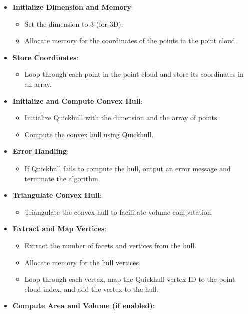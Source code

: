 \begin{itemize}
	\item \textbf{Initialize Dimension and Memory}:
	      \begin{itemize}
		      \item Set the dimension to 3 (for 3D).
		      \item Allocate memory for the coordinates of the points in the point cloud.
	      \end{itemize}
	\item \textbf{Store Coordinates}:
	      \begin{itemize}
		      \item Loop through each point in the point cloud and store its coordinates in an array.
	      \end{itemize}
	\item \textbf{Initialize and Compute Convex Hull}:
	      \begin{itemize}
		      \item Initialize Quickhull with the dimension and the array of points.
		      \item Compute the convex hull using Quickhull.
	      \end{itemize}
	\item \textbf{Error Handling}:
	      \begin{itemize}
		      \item If Quickhull fails to compute the hull, output an error message and terminate the algorithm.
	      \end{itemize}
	\item \textbf{Triangulate Convex Hull}:
	      \begin{itemize}
		      \item Triangulate the convex hull to facilitate volume computation.
	      \end{itemize}
	\item \textbf{Extract and Map Vertices}:
	      \begin{itemize}
		      \item Extract the number of facets and vertices from the hull.
		      \item Allocate memory for the hull vertices.
		      \item Loop through each vertex, map the Quickhull vertex ID to the point cloud index, and add the vertex to the hull.
	      \end{itemize}
	\item \textbf{Compute Area and Volume (if enabled)}:
	      \begin{itemize}

\end{itemize}
\end{itemize}
